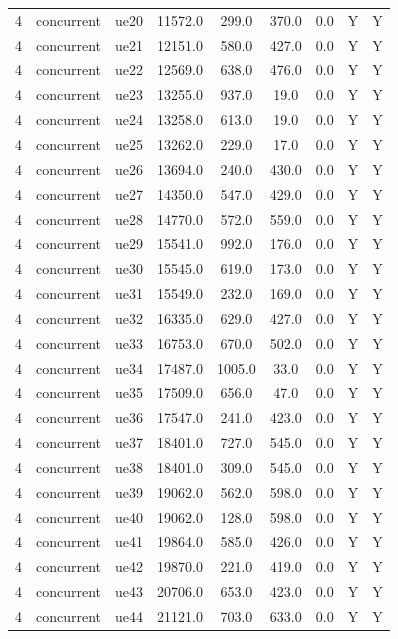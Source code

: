 \begin{table}[ht]
\begin{tabular}{|c|c|c|c|c|c|c|c|c|}
4 & concurrent & ue20 & 11572.0 & 299.0 & 370.0 & 0.0 & Y & Y \\
4 & concurrent & ue21 & 12151.0 & 580.0 & 427.0 & 0.0 & Y & Y \\
4 & concurrent & ue22 & 12569.0 & 638.0 & 476.0 & 0.0 & Y & Y \\
4 & concurrent & ue23 & 13255.0 & 937.0 & 19.0 & 0.0 & Y & Y \\
4 & concurrent & ue24 & 13258.0 & 613.0 & 19.0 & 0.0 & Y & Y \\
4 & concurrent & ue25 & 13262.0 & 229.0 & 17.0 & 0.0 & Y & Y \\
4 & concurrent & ue26 & 13694.0 & 240.0 & 430.0 & 0.0 & Y & Y \\
4 & concurrent & ue27 & 14350.0 & 547.0 & 429.0 & 0.0 & Y & Y \\
4 & concurrent & ue28 & 14770.0 & 572.0 & 559.0 & 0.0 & Y & Y \\
4 & concurrent & ue29 & 15541.0 & 992.0 & 176.0 & 0.0 & Y & Y \\
4 & concurrent & ue30 & 15545.0 & 619.0 & 173.0 & 0.0 & Y & Y \\
4 & concurrent & ue31 & 15549.0 & 232.0 & 169.0 & 0.0 & Y & Y \\
4 & concurrent & ue32 & 16335.0 & 629.0 & 427.0 & 0.0 & Y & Y \\
4 & concurrent & ue33 & 16753.0 & 670.0 & 502.0 & 0.0 & Y & Y \\
4 & concurrent & ue34 & 17487.0 & 1005.0 & 33.0 & 0.0 & Y & Y \\
4 & concurrent & ue35 & 17509.0 & 656.0 & 47.0 & 0.0 & Y & Y \\
4 & concurrent & ue36 & 17547.0 & 241.0 & 423.0 & 0.0 & Y & Y \\
4 & concurrent & ue37 & 18401.0 & 727.0 & 545.0 & 0.0 & Y & Y \\
4 & concurrent & ue38 & 18401.0 & 309.0 & 545.0 & 0.0 & Y & Y \\
4 & concurrent & ue39 & 19062.0 & 562.0 & 598.0 & 0.0 & Y & Y \\
4 & concurrent & ue40 & 19062.0 & 128.0 & 598.0 & 0.0 & Y & Y \\
4 & concurrent & ue41 & 19864.0 & 585.0 & 426.0 & 0.0 & Y & Y \\
4 & concurrent & ue42 & 19870.0 & 221.0 & 419.0 & 0.0 & Y & Y \\
4 & concurrent & ue43 & 20706.0 & 653.0 & 423.0 & 0.0 & Y & Y \\
4 & concurrent & ue44 & 21121.0 & 703.0 & 633.0 & 0.0 & Y & Y \\

\end{tabular}
\end{table}
